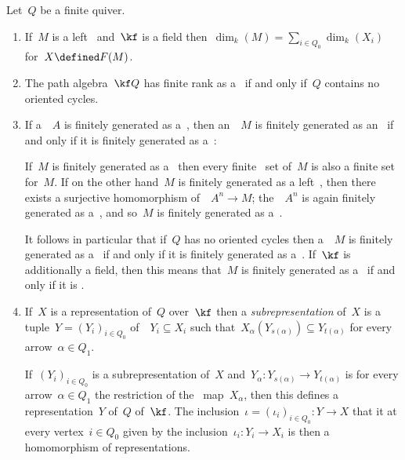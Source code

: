 \begin{remark}
  Let~$Q$ be a finite quiver.
  \begin{enumerate}
    \item
      If~$M$ is a left~{} and~{$\kf$} is a field then~$\dim_k(M) = \sum_{i \in Q_0} \dim_k(X_i)$ for~$X \defined F(M)$.
    \item
      The path algebra~$\kf Q$ has finite rank as a~{\module{$\kf$}} if and only if~$Q$ contains no oriented cycles.
    \item
      If a~{\kalg}~$A$ is finitely generated as a~{\module{$\kf$}}, then an~{}~$M$ is finitely generated as an~{} if and only if it is finitely generated as a~{\module{$\kf$}}:

      If~$M$ is finitely generated as a~{\module{$\kf$}} then every finite~ set of~$M$ is also a finite  set for~$M$.
      If on the other hand~$M$ is finitely generated as a left~{}, then there exists a surjective homomorphism of~{}~$A^n \to M$;
      the~{}~$A^n$ is again finitely generated as a~{\module{$\kf$}}, and so~$M$ is finitely generated as a~{\module{$\kf$}}.
      
      It follows in particular that if~$Q$ has no oriented cycles then a~{}~$M$ is finitely generated as a~{} if and only if it is finitely generated as a~{\module{$\kf$}}.
      If~$\kf$ is additionally a field, then this means that~$M$ is finitely generated as a~{} if and only if it is {\fd}.
    \item
      If~$X$ is a representation of~$Q$ over~$\kf$ then a \emph{subrepresentation} of~$X$ is a tuple~$Y = (Y_i)_{i \in Q_0}$ of~{\submodules{$\kf$}}~$Y_i \subseteq X_i$ such that~$X_\alpha( Y_{s(\alpha)} ) \subseteq Y_{t(\alpha)}$ for every arrow~$\alpha \in Q_1$.
      
      If~$(Y_i)_{i \in Q_0}$ is a subrepresentation of~$X$ and~$Y_\alpha \colon Y_{s(\alpha)} \to Y_{t(\alpha)}$ is for every arrow~$\alpha \in Q_1$ the restriction of the~{\klin} map~$X_\alpha$, then this defines a representation~$Y$ of~$Q$ of~$\kf$.
      The inclusion~$\iota = (\iota_i)_{i \in Q_0} \colon Y \to X$ that it at every vertex~$i \in Q_0$ given by the inclusion~$\iota_i \colon Y_i \to X_i$ is then a homomorphism of representations.
      

\end{enumerate}
\end{remark}
